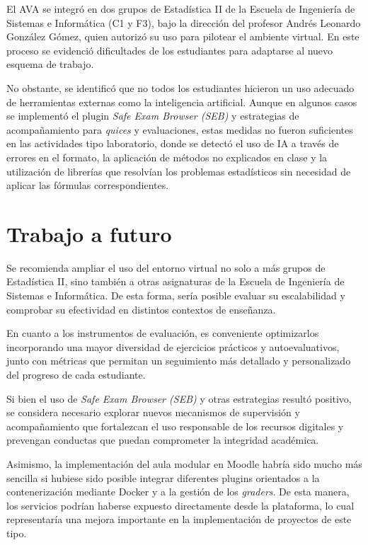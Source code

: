 \documentclass[letter,oneside,12pt,spanish]{report}
\begin{document}
El AVA se integró en dos grupos de Estadística II de la Escuela de Ingeniería de Sistemas e Informática (C1 y F3), bajo la dirección del profesor Andrés Leonardo González Gómez, quien autorizó su uso para pilotear el ambiente virtual. En este proceso se evidenció dificultades de los estudiantes para adaptarse al nuevo esquema de trabajo.

No obstante, se identificó que no todos los estudiantes hicieron un uso adecuado de herramientas externas como la inteligencia artificial. Aunque en algunos casos se implementó el plugin \textit{Safe Exam Browser (SEB)} y estrategias de acompañamiento para \textit{quices} y evaluaciones, estas medidas no fueron suficientes en las actividades tipo laboratorio, donde se detectó el uso de IA a través de errores en el formato, la aplicación de métodos no explicados en clase y la utilización de librerías que resolvían los problemas estadísticos sin necesidad de aplicar las fórmulas correspondientes.



\section{Trabajo a futuro}

Se recomienda ampliar el uso del entorno virtual no solo a más grupos de Estadística II, sino también a otras asignaturas de la Escuela de Ingeniería de Sistemas e Informática. De esta forma, sería posible evaluar su escalabilidad y comprobar su efectividad en distintos contextos de enseñanza.

En cuanto a los instrumentos de evaluación, es conveniente optimizarlos incorporando una mayor diversidad de ejercicios prácticos y autoevaluativos, junto con métricas que permitan un seguimiento más detallado y personalizado del progreso de cada estudiante.

Si bien el uso de \textit{Safe Exam Browser (SEB)} y otras estrategias resultó positivo, se considera necesario explorar nuevos mecanismos de supervisión y acompañamiento que fortalezcan el uso responsable de los recursos digitales y prevengan conductas que puedan comprometer la integridad académica.

Asimismo, la implementación del aula modular en Moodle habría sido mucho más sencilla si hubiese sido posible integrar diferentes plugins orientados a la contenerización mediante Docker y a la gestión de los \textit{graders}. De esta manera, los servicios podrían haberse expuesto directamente desde la plataforma, lo cual representaría una mejora importante en la implementación de proyectos de este tipo.
\end{document}
